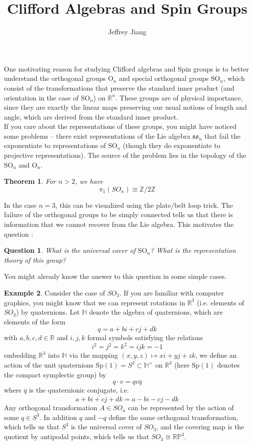 \documentclass[psamsfonts, 12pt]{amsart}
\newtheorem{thm}{Theorem}[section]
\newtheorem*{quest*}{Question}
\theoremstyle{definition}
\newtheorem{exmp}[thm]{Example}
\theoremstyle{remark}
\newcommand{\R}{\mathbb{R}}
\renewcommand{\H}{\mathbb{H}}
\newcommand{\Z}{\mathbb{Z}}
\newcommand{\RP}{\mathbb{RP}}
\newcommand{\SO}{\mathrm{SO}}
\begin{document}
%
\author{Jeffrey Jiang}
%
\title{Clifford Algebras and Spin Groups}
%
\maketitle
%
One motivating reason for studying Clifford algebras and Spin groups is to better
understand the orthogonal groups $\mathrm{O}_n$ and special orthogonal groups $\SO_n$,
which consist of the transformations that preserve the standard inner product
(and orientation in the case of $\SO_n$) on $\R^n$. These groups are of physical
importance, since they are exactly the linear maps preserving our usual notions of
length and angle, which are derived from the standard inner product. \\

If you care about the representations of these groups, you might have noticed some
problems -- there exist representations of the Lie algebra $\mathfrak{so}_n$ that fail
the exponentiate to representations of $\SO_n$ (though they do exponentiate to
projective representations). The source of the problem lies in the topology of the
$\SO_n$ and $\mathrm{O}_n$.
%
\begin{thm}
For $n > 2$, we have
\[
\pi_1(SO_n) \cong \Z/2\Z
\]
\end{thm}
%
In the case $n=3$, this can be visualized using the plate/belt loop trick.
The failure of the orthogonal groups to be simply connected tells us that
there is information that we cannot recover from the Lie algebra. This motivates the
question :
%
\begin{quest*}
What is the universal cover of $\SO_n$? What is the representation theory of this
group?
\end{quest*}
%
You might already know the answer to this question in some simple cases.
%
\begin{exmp}
Consider the case of $SO_3$. If you are familiar with computer graphics, you might
know that we can represent rotations in $\R^3$ (i.e. elements of $SO_3$) by quaternions.
Let $\H$ denote the algebra of quaternions, which are elements of the form
\[
q = a + bi + cj + dk
\]
with $a,b,c,d \in \R$ and $i,j,k$ formal symbols satisfying the relations
\[
i^2 = j^2 = k^2 = ijk = -1
\]
embedding $\R^3$ into $\H$ via the mapping $(x,y,z) \mapsto xi + yj + zk$, we define
an action of the unit quaternions $\mathrm{Sp}(1) = S^3 \subset \H^\times$ on $\R^3$
(here $\mathrm{Sp}(1)$ denotes the compact symplectic group) by
\[
q\cdot v = qv\overline{q}
\]
where $\overline{q}$ is the quaternionic conjugate, i.e.
\[
\overline{a + bi + cj + dk} = a - bi - cj - dk
\]
Any orthogonal transformation $A \in SO_n$ can be represented by the action of some
$q \in S^3$. In addition $q$ and $-q$ define the same orthogonal transformation, which
tells us that $S^3$ is the universal cover of $SO_3$, and the covering map is
the quotient by antipodal points, which tells us that $SO_3 \cong \RP^3$.
\end{exmp}
\end{document}
